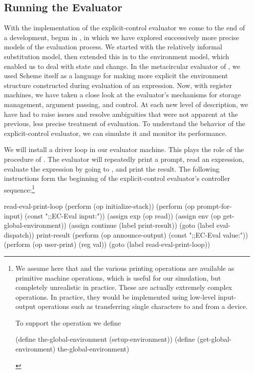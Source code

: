\subsection{Running the Evaluator}
\label{Section 5.4.4}

With the implementation of the explicit-control evaluator we come to the end of
a development, begun in , in which we have explored successively
more precise models of the evaluation process.  We started with the relatively
informal substitution model, then extended this in  to the
environment model, which enabled us to deal with state and change.  In the
metacircular evaluator of , we used Scheme itself as a language
for making more explicit the environment structure constructed during
evaluation of an expression.  Now, with register machines, we have taken a
close look at the evaluator's mechanisms for storage management, argument
passing, and control.  At each new level of description, we have had to raise
issues and resolve ambiguities that were not apparent at the previous, less
precise treatment of evaluation.  To understand the behavior of the
explicit-control evaluator, we can simulate it and monitor its performance.

We will install a driver loop in our evaluator machine.  This plays the role of
the  procedure of .  The evaluator will
repeatedly print a prompt, read an expression, evaluate the expression by going
to , and print the result.  The following instructions form
the beginning of the explicit-control evaluator's controller
sequence:\footnote{We assume here that  and the various printing
operations are available as primitive machine operations, which is useful for
our simulation, but completely unrealistic in practice.  These are actually
extremely complex operations.  In practice, they would be implemented using
low-level input-output operations such as transferring single characters to and
from a device.

To support the  operation we define

\begin{compactCodeBlock}
(define the-global-environment (setup-environment))
(define (get-global-environment) the-global-environment)
\end{compactCodeBlock}
}

\begin{codeBlock}
read-eval-print-loop
  (perform (op initialize-stack))
  (perform
   (op prompt-for-input) (const ";;EC-Eval input:"))
  (assign exp (op read))
  (assign env (op get-global-environment))
  (assign continue (label print-result))
  (goto (label eval-dispatch))
print-result
  (perform (op announce-output)
           (const ";;EC-Eval value:"))
  (perform (op user-print) (reg val))
  (goto (label read-eval-print-loop))
\end{codeBlock}

